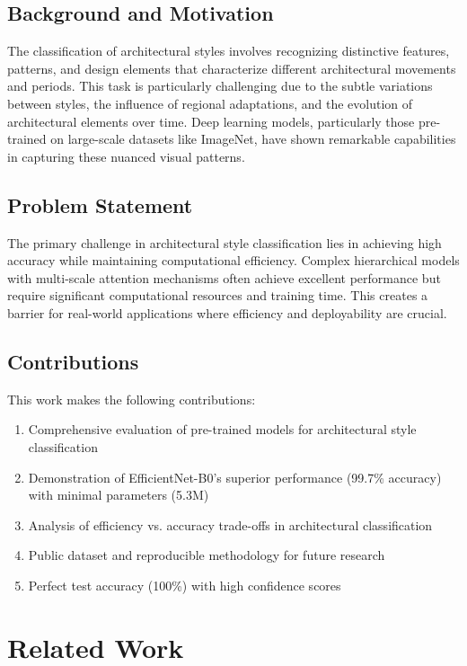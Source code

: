 \documentclass[conference]{IEEEtran}
\begin{document}
\subsection{Background and Motivation}

The classification of architectural styles involves recognizing distinctive features, patterns, and design elements that characterize different architectural movements and periods. This task is particularly challenging due to the subtle variations between styles, the influence of regional adaptations, and the evolution of architectural elements over time. Deep learning models, particularly those pre-trained on large-scale datasets like ImageNet, have shown remarkable capabilities in capturing these nuanced visual patterns.

\subsection{Problem Statement}

The primary challenge in architectural style classification lies in achieving high accuracy while maintaining computational efficiency. Complex hierarchical models with multi-scale attention mechanisms often achieve excellent performance but require significant computational resources and training time. This creates a barrier for real-world applications where efficiency and deployability are crucial.

\subsection{Contributions}

This work makes the following contributions:

\begin{enumerate}
    \item Comprehensive evaluation of pre-trained models for architectural style classification
    \item Demonstration of EfficientNet-B0's superior performance (99.7\% accuracy) with minimal parameters (5.3M)
    \item Analysis of efficiency vs. accuracy trade-offs in architectural classification
    \item Public dataset and reproducible methodology for future research
    \item Perfect test accuracy (100\%) with high confidence scores
\end{enumerate}

\section{Related Work}
\end{document}
